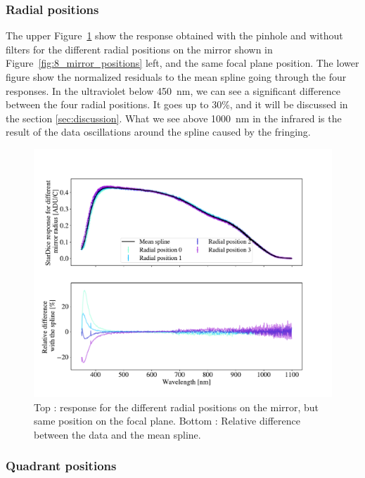 \subsubsection{Radial positions}

The upper Figure~\ref{fig:radial_positions} show the \SD response obtained with the \spinhole pinhole and without filters for the different radial positions on the mirror shown in Figure~\ref{fig:8_mirror_positions} left, and the same focal plane position. The lower figure show the normalized residuals to the mean spline going through the four responses. In the ultraviolet below \SI{450}{\nm}, we can see a significant difference between the four radial positions. It goes up to 30\%, and it will be discussed in the section \ref{sec:discussion}. What we see above \SI{1000}{\nm} in the infrared is the result of the data oscillations around the spline caused by the fringing. 

\begin{figure}[h]
    \centering
    \includegraphics[width=\columnwidth]{fig/radial_positions.pdf}
    \caption{Top : \SD response for the different radial positions on the mirror, but same position on the focal plane. Bottom : Relative difference between the data and the mean spline.}
    \label{fig:radial_positions}
\end{figure}

\subsubsection{Quadrant positions}

